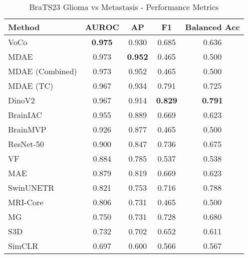 \begin{table}[ht]
\centering
\caption{BraTS23 Glioma vs Metastasis - Performance Metrics}
\label{tab:brats23_gli_vs_met}
\begin{tabular}{lcccc}
\toprule
Method & AUROC & AP & F1 & Balanced Acc \\
\midrule
VoCo & \textbf{0.975} & 0.930 & 0.685 & 0.636 \\
MDAE & 0.973 & \textbf{0.952} & 0.465 & 0.500 \\
MDAE (Combined) & 0.973 & 0.952 & 0.465 & 0.500 \\
MDAE (TC) & 0.967 & 0.934 & 0.791 & 0.725 \\
DinoV2 & 0.967 & 0.914 & \textbf{0.829} & \textbf{0.791} \\
BrainIAC & 0.955 & 0.889 & 0.669 & 0.623 \\
BrainMVP & 0.926 & 0.877 & 0.465 & 0.500 \\
ResNet-50 & 0.900 & 0.847 & 0.736 & 0.675 \\
VF & 0.884 & 0.785 & 0.537 & 0.538 \\
MAE & 0.879 & 0.819 & 0.669 & 0.623 \\
SwinUNETR & 0.821 & 0.753 & 0.716 & 0.788 \\
MRI-Core & 0.806 & 0.731 & 0.465 & 0.500 \\
MG & 0.750 & 0.731 & 0.728 & 0.680 \\
S3D & 0.732 & 0.702 & 0.652 & 0.611 \\
SimCLR & 0.697 & 0.600 & 0.566 & 0.567 \\
\bottomrule
\end{tabular}
\end{table}
